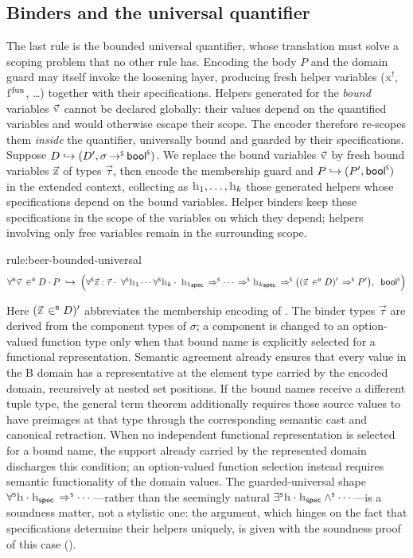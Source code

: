 \subsection{Binders and the universal quantifier}
\label{sec:beer-rules-quantifier}

The last rule is the bounded universal quantifier, whose translation must solve a scoping problem that no other rule has.
Encoding the body \(P\) and the domain guard may itself invoke the loosening layer, producing fresh helper variables (\(\lvar{x}\), \(\var{f}^{\mathrm{fun}}\), \dots) together with their specifications.
Helpers generated for the \emph{bound} variables \(\vec{\var{v}}\) cannot be declared globally: their values depend on the quantified variables and would otherwise escape their scope.
The encoder therefore re-scopes them \emph{inside} the quantifier, universally bound and guarded by their specifications.
Suppose \(D \mathrel{\hookrightarrow} (D', \sigma \mathbin{\to^{\scriptscriptstyle{\mathsf{S}}}} \mathsf{bool}^{\scriptscriptstyle{\mathsf{S}}})\).
We replace the bound variables \(\vec{\var{v}}\) by fresh bound variables \(\vec{\var{z}}\) of types \(\vec{\tau}\), then encode the membership guard and \(P \mathrel{\hookrightarrow} (P', \mathsf{bool}^{\scriptscriptstyle{\mathsf{S}}})\) in the extended context, collecting as \(\var{h}_1, \dots, \var{h}_k\) those generated helpers whose specifications depend on the bound variables.
Helper binders keep these specifications in the scope of the variables on which they depend; helpers involving only free variables remain in the surrounding scope.
\begin{encrule}{rule:beer-bounded-universal}
\[
  \forallB \vec{\var{v}} \inB D \cdot P
  \;\encto\;
  \Bigl(\forallS \vec{\var{z}} : \vec{\tau} \cdot\;
    \forallS \var{h}_1 \cdots \forallS \var{h}_k \cdot\;
    \spec{{\var{h}_1}} \impS \cdots \impS \spec{{\var{h}_k}} \impS
    \bigl( (\vec{\var{z}} \inB D)' \impS P' \bigr),\;\;
  \boolS\Bigr)
\]
\end{encrule}
Here \((\vec{\var{z}} \inB D)'\) abbreviates the membership encoding of .
The binder types \(\vec{\tau}\) are derived from the component types of \(\sigma\); a component is changed to an option-valued function type only when that bound name is explicitly selected for a functional representation.
Semantic agreement already ensures that every value in the B domain has a representative at the element type carried by the encoded domain, recursively at nested set positions.
If the bound names receive a different tuple type, the general term theorem additionally requires those source values to have preimages at that type through the corresponding semantic cast and canonical retraction.
When no independent functional representation is selected for a bound name, the support already carried by the represented domain discharges this condition; an option-valued function selection instead requires semantic functionality of the domain values.
The guarded-universal shape \(\forallS \var{h} \cdot \spec{\var{h}} \impS \cdots\)---rather than the seemingly natural \(\existsS \var{h} \cdot \spec{\var{h}} \andS \cdots\)---is a soundness matter, not a stylistic one: the argument, which hinges on the fact that specifications determine their helpers uniquely, is given with the soundness proof of this case ().

